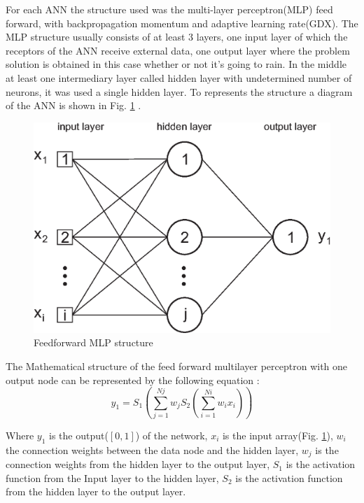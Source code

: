 For each ANN the structure used was the multi-layer perceptron(MLP) feed forward, with backpropagation momentum and adaptive learning rate(GDX). The MLP structure usually consists of at least 3 layers, one input layer of which the receptors of the ANN receive external data, one output layer where the problem solution is obtained in this case whether or not it's going to rain. In the middle at least one intermediary layer called hidden layer with undetermined number of neurons, it was used a single hidden layer. To represents the structure a diagram of the ANN is shown in Fig. \ref{img:figure2} .

\begin{figure}[htb!]
 \centering
 \includegraphics[scale=0.75]{capitulo_2/diagram_ann}
 \caption{Feedforward MLP structure}
 \label{img:figure2}
\end{figure}
The Mathematical structure of the feed forward multilayer perceptron with one output node can be represented by the following equation \cite{luk2000study}:
\begin{equation}
 \label{eq:solve15}
 y_1 = S_1(\sum\limits_{j=1}^{Nj} w_j S_2(\sum\limits_{i=1}^{Ni} w_i x_i))
\end{equation}

Where $y_1$ is the output($[0, 1]$) of the network, $x_i$ is the input array(Fig. \ref{img:figure2}), $w_i$ the connection weights between the data node and the hidden layer, $w_j$ is the connection weights from the hidden layer to the output layer, $S_1$ is the activation function from the Input layer to the hidden layer, $S_2$ is the activation function from the hidden layer to the output layer.

